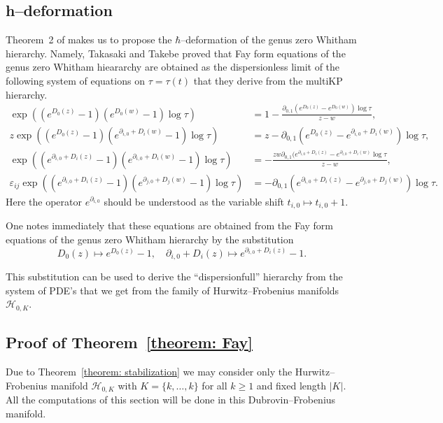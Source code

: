 \documentclass[12pt,a4paper]{amsart}
\def\H{{\mathcal H}}
\newcommand{\p}{{\partial}}
\newcommand{\<}{\left<}
\renewcommand{\>}{\right>}
\newcommand{\eps}{\varepsilon}
\numberwithin{equation}{section}
\begin{document}
\subsection{h--deformation}\label{section: h-deformation}
Theorem~2 of \cite{TT07} makes us to propose the $\hbar$--deformation of the genus zero Whitham hierarchy. Namely, Takasaki and Takebe proved that Fay form equations of the genus zero Whitham hieararchy are obtained as the dispersionless limit of the following system of equations on $\tau = \tau(t)$ that they derive from the multiKP hierarchy.
\begin{align*}
    \exp \left( (e^{D_0(z)}-1)(e^{D_0(w)}-1) \log \tau \right) 
    &= 1 - \frac{\p_{0,1} (e^{D_0(z)} - e^{D_0(w)}) \log \tau}{z - w},
    \\
    z \exp \left( (e^{D_0(z)}-1)(e^{\p_{i,0} + D_i(w)}-1) \log \tau  \right) 
    &= z - \p_{0,1} (e^{D_0(z)} - e^{\p_{i,0} + D_i(w)}) \log \tau,
    \\
    \exp \left( (e^{\p_{i,0} + D_i(z)} - 1) (e^{\p_{i,0} + D_i(w)}-1) \log \tau \right)
    &= - \frac{zw \p_{0,1} (e^{\p_{i,0} + D_i(z)} - e^{\p_{i,0} + D_i(w)} \log \tau }{z - w},
    \\
    \eps_{ij} \exp \left( (e^{\p_{i,0} + D_i(z)}-1)(e^{\p_{j,0} + D_j(w)}-1) \log \tau \right)
    &= - \p_{0,1} (e^{\p_{i,0} + D_i(z)} - e^{\p_{j,0} + D_j(w)}) \log \tau.
\end{align*}
Here the operator $e^{\p_{i,0}}$ should be understood as the variable shift 
$t_{i,0} \mapsto t_{i,0}+1$.

One notes immediately that these equations are obtained from the Fay form equations of the genus zero Whitham hierarchy by the substitution
\[
    D_0(z) \mapsto e^{D_0(z)} - 1, \quad \p_{i,0} + D_i(z) \mapsto e^{\p_{i,0} + D_i(z)} - 1.
\]

This substitution can be used to derive the ``dispersionfull'' hierarchy from the system of PDE's that we get from the family of Hurwitz--Frobenius manifolds $\H_{0,K}$.


\subsection{Proof of Theorem~\ref{theorem: Fay}}\label{section: proof}
Due to Theorem~\ref{theorem: stabilization} we may consider only the Hurwitz--Frobenius manifold $\H_{0,K}$ with $K = \lbrace k,\dots, k \rbrace$ for all $k \ge 1$ and fixed length $|K|$.
All the computations of this section will be done in this Dubrovin--Frobenius manifold.
\end{document}
